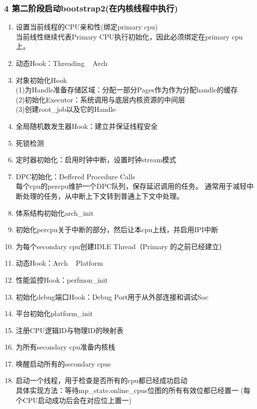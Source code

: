 \documentclass[
8pt, %
]{beamer}
\begin{document}
	\begin{frame}
		\frametitle{4 第二阶段启动bootstrap2(在内核线程中执行)}
		\begin{enumerate}
			\item 设置当前线程的CPU亲和性(绑定primary cpu)\\
			当前线性继续代表Primary CPU执行初始化，因此必须绑定在primary cpu上。
			\item 动态Hook：Threading ~ Arch
			\item 对象初始化Hook\\
			(1)为Handle准备存储区域：分配一部分Pages作为作为分配handle的缓存\\
			(2)初始化Executor：系统调用与底层内核资源的中间层\\
			(3)创建root\_job以及它的Handle
			\item 全局随机数发生器Hook：建立并保证线程安全
			\item 死锁检测
			\item 定时器初始化：启用时钟中断，设置时钟stream模式
			\item DPC初始化：Deffered Procedure Calls\\
			每个cpu的percpu维护一个DPC队列，保存延迟调用的任务。
			通常用于减轻中断处理的任务，从中断上下文转到普通上下文中处理。
			\item 体系结构初始化arch\_init
			\item 初始化percpu关于中断的部分，然后让本cpu上线，并启用IPI中断
			\item 为每个secondary cpu创建IDLE Thread（Primary 的之前已经建立）
			\item 动态Hook：Arch ~ Platform
			\item 性能监控Hook：perfmon\_init
			\item 初始化debug端口Hook：Debug Port用于从外部连接和调试Soc
			\item 平台初始化platform\_init
			\item 注册CPU逻辑ID与物理ID的映射表
			\item 为所有secondary cpu准备内核栈
			\item 唤醒启动所有的secondary cpus
			\item 启动一个线程，用于检查是否所有的cpu都已经成功启动\\
			具体实现方法：等待mp\_state.online\_cpus位图的所有有效位都已经置一 (每个CPU启动成功后会在对应位上置一)
		\end{enumerate}
	\end{frame}
\end{document}
